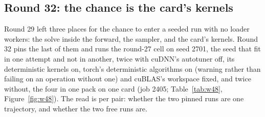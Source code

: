 \subsection{Round 32: the chance is the card's kernels}
\label{sec:round32}

Round 29 left three places for the chance to enter a seeded run with no loader
workers: the solve inside the forward, the sampler, and the card's kernels. Round 32
pins the last of them and runs the round-27 cell on seed 2701, the seed that fit in
one attempt and not in another, twice with cuDNN's autotuner off, its deterministic
kernels on, torch's deterministic algorithms on (warning rather than failing on an
operation without one) and cuBLAS's workspace fixed, and twice without, the four in
one pack on one card (job 2405; Table~\ref{tab:w48}, Figure~\ref{fig:w48}). The read
is per pair: whether the two pinned runs are one trajectory, and whether the two free
runs are.




